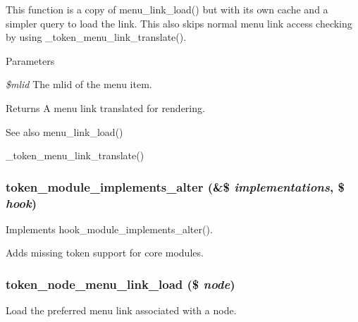This function is a copy of menu\_\-link\_\-load() but with its own cache and a simpler query to load the link. This also skips normal menu link access checking by using \_\-token\_\-menu\_\-link\_\-translate().


\begin{DoxyParams}{Parameters}
\item[{\em \$mlid}]The mlid of the menu item.\end{DoxyParams}
\begin{DoxyReturn}{Returns}
A menu link translated for rendering.
\end{DoxyReturn}
\begin{DoxySeeAlso}{See also}
menu\_\-link\_\-load() 

\_\-token\_\-menu\_\-link\_\-translate() 
\end{DoxySeeAlso}
\hypertarget{token_8module_aa9de071c35f0534b7d316f25bea3c6f1}{
\subsubsection[{token\_\-module\_\-implements\_\-alter}]{\setlength{\rightskip}{0pt plus 5cm}token\_\-module\_\-implements\_\-alter (\&\$ {\em implementations}, \/  \$ {\em hook})}}
\label{token_8module_aa9de071c35f0534b7d316f25bea3c6f1}
Implements hook\_\-module\_\-implements\_\-alter().

Adds missing token support for core modules. \hypertarget{token_8module_a549ee65529db4c066963f05fad4bbc15}{
\subsubsection[{token\_\-node\_\-menu\_\-link\_\-load}]{\setlength{\rightskip}{0pt plus 5cm}token\_\-node\_\-menu\_\-link\_\-load (\$ {\em node})}}
\label{token_8module_a549ee65529db4c066963f05fad4bbc15}
Load the preferred menu link associated with a node.


